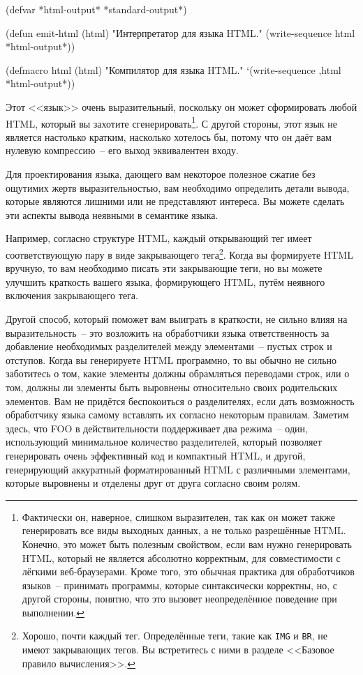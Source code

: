 \begin{myverb}
(defvar *html-output* *standard-output*)

(defun emit-html (html)
  "Интерпретатор для языка HTML."
  (write-sequence html *html-output*))

(defmacro html (html)
  "Компилятор для языка HTML."
  `(write-sequence ,html *html-output*))
\end{myverb}

Этот <<язык>> очень выразительный, поскольку он может сформировать любой HTML, который вы
захотите сгенерировать\footnote{Фактически он, наверное, слишком выразителен, так как он
  может также генерировать все виды выходных данных, а не только разрешённые
  HTML. Конечно, это может быть полезным свойством, если вам нужно генерировать HTML, который не является
  абсолютно корректным, для совместимости с лёгкими веб-браузерами. Кроме того, это
  обычная практика для обработчиков языков~-- принимать программы, которые синтаксически
  корректны, но, с другой стороны, понятно, что это вызовет неопределённое поведение при
  выполнении.}. С другой стороны, этот язык не является настолько кратким, насколько
хотелось бы, потому что он даёт вам нулевую компрессию~-- его выход эквивалентен входу.

Для проектирования языка, дающего вам некоторое полезное сжатие без ощутимих жертв
выразительностью, вам необходимо определить детали вывода, которые являются лишними или не
представляют интереса. Вы можете сделать эти аспекты вывода неявными в семантике языка.

Например, согласно структуре HTML, каждый открывающий тег имеет соответствующую пару в
виде закрывающего тега\footnote{Хорошо, почти каждый тег. Определённые теги, такие как
  \lstinline{IMG} и \lstinline{BR}, не имеют закрывающих тегов.  Вы встретитесь с ними в
  разделе <<Базовое правило вычисления>>.}. Когда вы формируете HTML вручную, то вам
необходимо писать эти закрывающие теги, но вы можете улучшить краткость вашего языка,
формирующего HTML, путём неявного включения закрывающего тега.

Другой способ, который поможет вам выиграть в краткости, не сильно влияя на
выразительность~-- это возложить на обработчики языка ответственность за добавление
необходимых разделителей между элементами~-- пустых строк и отступов. Когда вы генерируете
HTML программно, то вы обычно не сильно заботитесь о том, какие элементы должны
обрамляться переводами строк, или о том, должны ли элементы быть выровнены относительно
своих родительских элементов. Вам не придётся беспокоиться о разделителях, если дать
возможность обработчику языка самому вставлять их согласно некоторым правилам. Заметим
здесь, что FOO в действительности поддерживает два режима~-- один, использующий
минимальное количество разделителей, который позволяет генерировать очень эффективный код
и компактный HTML, и другой, генерирующий аккуратный форматированный HTML с различными
элементами, которые выровнены и отделены друг от друга согласно своим ролям.

